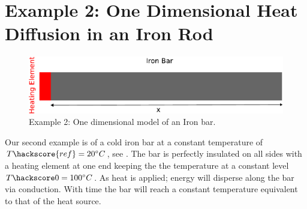 
%
%
%


\section{Example 2: One Dimensional Heat Diffusion in an Iron Rod}

\label{Sec:1DHDv0}
\begin{figure}[ht]
\centerline{\includegraphics[width=4.in]{figures/onedheatdiff002}}
\caption{Example 2: One dimensional model of an Iron bar.}
\label{fig:onedhdmodel}
\end{figure}

Our second example is of a cold iron bar at a constant temperature of
$T\hackscore{ref}=20^{\circ} C$, see . The bar is
perfectly insulated on all sides with a heating element at one end keeping the
the temperature at a constant level $T\hackscore0=100^{\circ} C$.  As heat is
applied; energy will disperse along the bar via conduction. With time the bar
will reach a constant temperature equivalent to that of the heat source.

